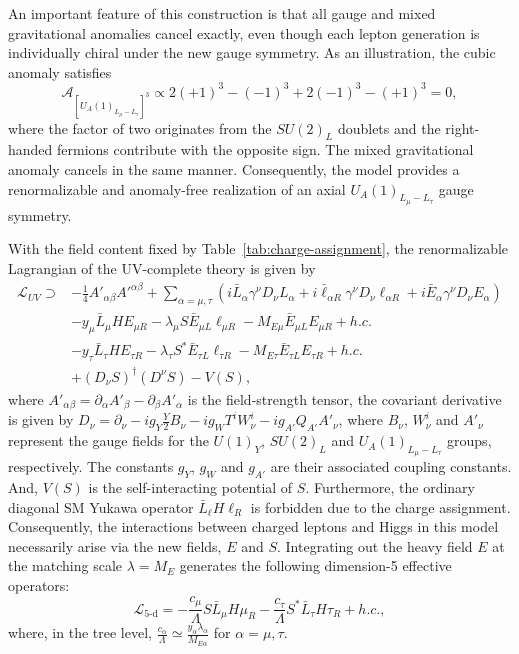 \documentclass[onecolumn, aps, nofootinbib, prd, preprint, floats, floatfix, amsmath, amssymb, superscriptaddress, preprintnumbers]{revtex4-2}
\begin{document}
An important feature of this construction is that all gauge and mixed gravitational anomalies cancel exactly, even though each lepton generation is individually chiral under the new gauge symmetry. As an illustration, the cubic anomaly satisfies \cite{Ismail:2016tod}
\begin{equation}
\mathcal{A}_{[U_A(1)_{L_\mu-L_\tau}]^3}
\propto
2(+1)^3
-(-1)^3
+2(-1)^3
-(+1)^3
=0,
\end{equation}
where the factor of two originates from the $SU(2)_L$ doublets and the right-handed fermions contribute with the opposite sign. The mixed gravitational anomaly cancels in the same manner. Consequently, the model provides a renormalizable and anomaly-free realization of an axial $U_A(1)_{L_\mu-L_\tau}$ gauge symmetry.



With the field content fixed by Table~\ref{tab:charge-assignment}, the renormalizable Lagrangian of the UV-complete theory is given by
\begin{equation}\label{eq:Lagrangian}
\begin{aligned}
\mathcal{L}_{UV}\supset& -\frac{1}{4}A'_{\alpha\beta}A'^{\alpha\beta}+\sum_{\alpha=\mu,\tau}\left(i\bar{L}_\alpha \gamma^\nu D_{\nu} L_\alpha + i\bar{\ell}_{\alpha R} \gamma^\nu D_{\nu}\ell_{\alpha R} + i\bar{E}_{\alpha}\gamma^\nu D_{\nu} E_{\alpha}\right)  \\
& -y_\mu \bar L_\mu H E_{\mu R} -\lambda_\mu S \bar E_{\mu L}\ell_{\mu R} -M_{E\mu}\bar E_{\mu L}E_{\mu R} + h.c.\\
&-y_\tau \bar L_\tau H E_{\tau R} -\lambda_\tau S^{*}\bar E_{\tau L}\ell_{\tau R} -M_{E\tau}\bar E_{\tau L}E_{\tau R} + h.c.\\
&+ (D_{\nu}S)^\dagger (D^{\nu}S) - V(S),
\end{aligned}
\end{equation}
where $A'_{\alpha\beta}=\partial_\alpha A'_\beta - \partial_\beta A'_\alpha$ is the field-strength tensor, the covariant derivative is given by $D_\nu = \partial_\nu -ig_Y \frac{Y}{2}B_\nu  -ig_W T^iW_\nu^i - ig_{A'} Q_{A'} A'_\nu$, where $B_\nu$, $W_\nu^i$ and $A'_\nu$ represent the gauge fields for the ${U(1)}_Y$, ${SU(2)}_L$ and ${U_A(1)}_{L_\mu-L_\tau}$ groups, respectively. The constants $g_Y$, $g_W$ and $g_{A'}$ are their associated coupling constants. And, $V(S)$ is the self-interacting potential of $S$. Furthermore, the ordinary diagonal SM Yukawa operator $\bar L_\ell H\ell_R$ is forbidden due to the charge assignment. Consequently, the interactions between charged leptons and Higgs in this model necessarily arise via the new fields, $E$ and $S$. Integrating out the heavy field $E$ at the matching scale $\lambda=M_E$ generates the following dimension-5 effective operators:
\begin{equation}\label{eq:5-d}
    \mathcal{L}_{\text{5-d}} =
    -\frac{c_\mu}{\Lambda} S \bar{L}_\mu H\mu_R
    -\frac{c_\tau}{\Lambda} S^* \bar{L}_\tau H\tau_R
    +h.c.,
\end{equation}
where, in the tree level, $\frac{c_\alpha}{\Lambda}\simeq \frac{y_\alpha \lambda_\alpha}{M_{E\alpha }}$ for $\alpha=\mu,\tau$.
\end{document}
